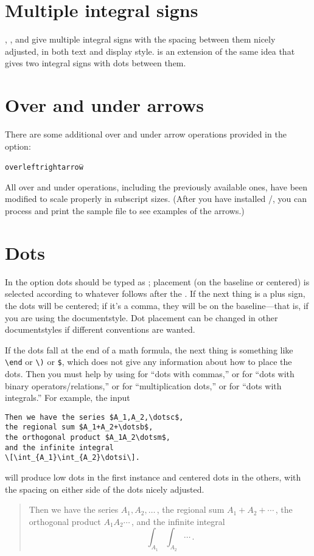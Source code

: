 \section{Multiple integral signs}
, , and  give multiple
integral signs with the spacing between them nicely adjusted,  in both
text and display style.   is an extension of the same
idea that gives two integral signs with dots between them.

\section{Over and under arrows}

There are some additional
over and under arrow operations provided in the  option:
{\samepage
\begin{tabbing}
\qquad\={\tt\bslash overleftrightarrow\qquad}\=\kill
\>  \>  \+\\
         \> 
\end{tabbing}
}
All over and under operations, including the previously
available ones, have been modified to
scale properly in subscript  sizes.
(After you have installed \amslatex/, you can process and print the
sample file  to see  examples of the arrows.)

\section{Dots} In the  option dots should be typed as
; placement (on the baseline or centered) is selected
according to whatever follows after the .  If the next thing is
a plus sign, the dots will be centered; if it's a comma, they will be on
the baseline---that is, if you are using the 
documentstyle.
Dot placement can be changed in other documentstyles if different
conventions are wanted.

If the dots fall at the end of a math formula, the next thing is
something like \verb"\end" or \verb"\)" or \verb"$", which does not give any
information about how to place the dots.  Then you must help by using
 for ``dots with commas,'' or  for ``dots with
binary operators/relations,'' or  for ``multiplication dots,''
or  for ``dots with integrals.'' For example, the input
\begin{verbatim}
Then we have the series $A_1,A_2,\dotsc$,
the regional sum $A_1+A_2+\dotsb$,
the orthogonal product $A_1A_2\dotsm$,
and the infinite integral
\[\int_{A_1}\int_{A_2}\dotsi\].
\end{verbatim}
will produce low dots in the first instance and centered dots
in the others, with the spacing on either side of the dots
nicely adjusted.
\begin{quotation}
Then we have the series $A_1,A_2,\ldots\,$,
the regional sum $A_1+A_2+\cdots\,$,
the orthogonal product $A_1A_2\cdots\,$,
and the infinite integral
\[\int_{A_1}\int_{A_2}\cdots\,.\]
\end{quotation}

